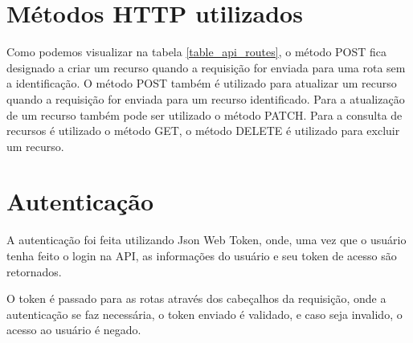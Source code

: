 \section{Métodos HTTP utilizados}

Como podemos visualizar na tabela \ref{table_api_routes}, o método POST fica designado a criar um recurso quando a requisição for enviada para uma rota sem a identificação. O método POST também é utilizado para atualizar um recurso quando a requisição for enviada para um recurso identificado. Para a atualização de um recurso também pode ser utilizado o método PATCH.
Para a consulta de recursos é utilizado o método GET, o método DELETE é utilizado para excluir um recurso.

\section{Autenticação}

A autenticação foi feita utilizando Json Web Token, onde, uma vez que o usuário tenha feito o login na API, as informações do usuário e seu token de acesso são retornados.

O token é passado para as rotas através dos cabeçalhos da requisição, onde a autenticação se faz necessária, o token enviado é validado, e caso seja invalido, o acesso ao usuário é negado.